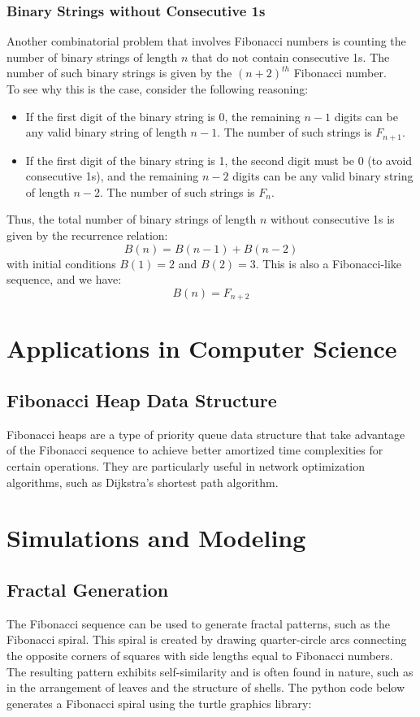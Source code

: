 \documentclass[openany]{book}
\begin{document}
\subsubsection{Binary Strings without Consecutive 1s}
Another combinatorial problem that involves Fibonacci numbers is counting the number of binary strings of length $n$ that do not contain consecutive 1s. The number of such binary strings is given by the $(n+2)^{th}$ Fibonacci number. \\
To see why this is the case, consider the following reasoning:
\begin{itemize}
    \item If the first digit of the binary string is 0, the remaining $n-1$ digits can be any valid binary string of length $n-1$. The number of such strings is $F_{n+1}$.
    \item If the first digit of the binary string is 1, the second digit must be 0 (to avoid consecutive 1s), and the remaining $n-2$ digits can be any valid binary string of length $n-2$. The number of such strings is $F_n$.
\end{itemize}
Thus, the total number of binary strings of length $n$ without consecutive 1s is given by the recurrence relation:
\[    B(n) = B(n-1) + B(n-2)
\]
with initial conditions $B(1) = 2$ and $B(2) = 3$. This is also a Fibonacci-like sequence, and we have:
\[    B(n) = F_{n+2}
\]

\section{Applications in Computer Science}
\subsection{Fibonacci Heap Data Structure}
Fibonacci heaps are a type of priority queue data structure that take advantage of the Fibonacci sequence to achieve better amortized time complexities for certain operations. They are particularly useful in network optimization algorithms, such as Dijkstra's shortest path algorithm.
\section{Simulations and Modeling}
\subsection{Fractal Generation}
The Fibonacci sequence can be used to generate fractal patterns, such as the Fibonacci spiral. This spiral is created by drawing quarter-circle arcs connecting the opposite corners of squares with side lengths equal to Fibonacci numbers. The resulting pattern exhibits self-similarity and is often found in nature, such as in the arrangement of leaves and the structure of shells.
The python code below generates a Fibonacci spiral using the turtle graphics library:
\end{document}
